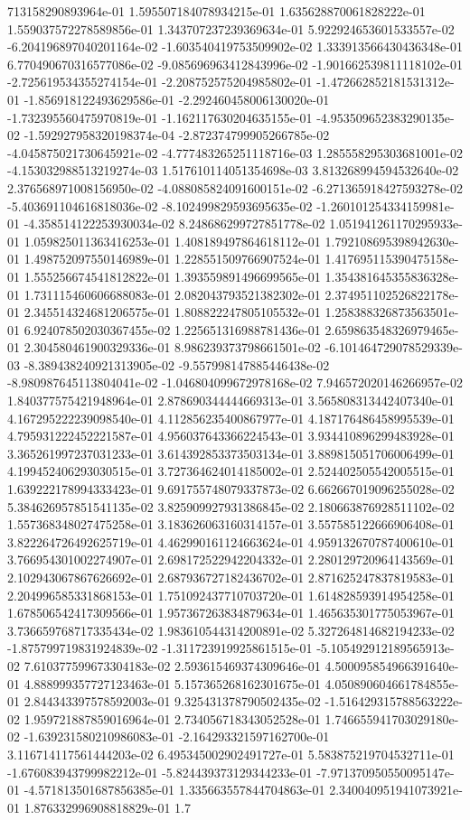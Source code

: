 713158290893964e-01	1.595507184078934215e-01	1.635628870061828222e-01	1.559037572278589856e-01	1.343707237239369634e-01	5.922924653601533557e-02	-6.204196897040201164e-02	-1.603540419753509902e-02	1.333913566430436348e-01	6.770490670316577086e-02	-9.085696963412843996e-02	-1.901662539811118102e-01	-2.725619534355274154e-01	-2.208752575204985802e-01	-1.472662852181531312e-01	-1.856918122493629586e-01	-2.292460458006130020e-01	-1.732395560475970819e-01	-1.162117630204635155e-01	-4.953509652383290135e-02	-1.592927958320198374e-04	-2.872374799905266785e-02	-4.045875021730645921e-02	-4.777483265251118716e-03	1.285558295303681001e-02	-4.153032988513219274e-03	1.517610114051354698e-03	3.813268994594532640e-02	2.376568971008156950e-02	-4.088085824091600151e-02	-6.271365918427593278e-02	-5.403691104616818036e-02	-8.102499829593695635e-02	-1.260101254334159981e-01	-4.358514122253930034e-02	8.248686299727851778e-02	1.051941261170295933e-01	1.059825011363416253e-01	1.408189497864618112e-01	1.792108695398942630e-01	1.498752097550146989e-01	1.228551509766907524e-01	1.417695115390475158e-01	1.555256674541812822e-01	1.393559891496699565e-01	1.354381645355836328e-01	1.731115460606688083e-01	2.082043793521382302e-01	2.374951102526822178e-01	2.345514324681206575e-01	1.808822247805105532e-01	1.258388326873563501e-01	6.924078502030367455e-02	1.225651316988781436e-01	2.659863548326979465e-01	2.304580461900329336e-01	8.986239373798661501e-02	-6.101464729078529339e-03	-8.389438240921313905e-02	-9.557998147885446438e-02	-8.980987645113804041e-02	-1.046804099672978168e-02	7.946572020146266957e-02	1.840377575421948964e-01	2.878690344444669313e-01	3.565808313442407340e-01	4.167295222239098540e-01	4.112856235400867977e-01	4.187176486458995539e-01	4.795931222452221587e-01	4.956037643366224543e-01	3.934410896299483928e-01	3.365261997237031233e-01	3.614392853373503134e-01	3.889815051706006499e-01	4.199452406293030515e-01	3.727364624014185002e-01	2.524402505542005515e-01	1.639222178994333423e-01	9.691755748079337873e-02	6.662667019096255028e-02	5.384626957851541135e-02	3.825909927931386845e-02	2.180663876928511102e-02	1.557368348027475258e-01	3.183626063160314157e-01	3.557585122666906408e-01	3.822264726492625719e-01	4.462990161124663624e-01	4.959132670787400610e-01	3.766954301002274907e-01	2.698172522942204332e-01	2.280129720964143569e-01	2.102943067867626692e-01	2.687936727182436702e-01	2.871625247837819583e-01	2.204996585331868153e-01	1.751092437710703720e-01	1.614828593914954258e-01	1.678506542417309566e-01	1.957367263834879634e-01	1.465635301775053967e-01	3.736659768717335434e-02	1.983610544314200891e-02	5.327264814682194233e-02	-1.875799719831924839e-02	-1.311723919925861515e-01	-5.105492912189565913e-02	7.610377599673304183e-02	2.593615469374309646e-01	4.500095854966391640e-01	4.888999357727123463e-01	5.157365268162301675e-01	4.050890604661784855e-01	2.844343397578592003e-01	9.325431378790502435e-02	-1.516429315788563222e-02	1.959721887859016964e-01	2.734056718343052528e-01	1.746655941703029180e-02	-1.639231580210986083e-01	-2.164293321597162700e-01	3.116714117561444203e-02	6.495345002902491727e-01	5.583875219704532711e-01	-1.676083943799982212e-01	-5.824439373129344233e-01	-7.971370950550095147e-01	-4.571813501687856385e-01	1.335663557844704863e-01	2.340040951941073921e-01	1.876332996908818829e-01	1.7
